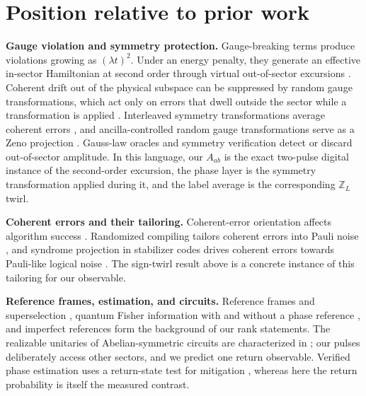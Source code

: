 \documentclass[11pt,a4paper]{article}
\begin{document}
\section*{Position relative to prior work}
\textbf{Gauge violation and symmetry protection.} Gauge-breaking terms produce violations growing as $(\lambda t)^2$. Under an energy penalty, they generate an effective in-sector Hamiltonian at second order through virtual out-of-sector excursions \cite{halimeh2020}. Coherent drift out of the physical subspace can be suppressed by random gauge transformations, which act only on errors that dwell outside the sector while a transformation is applied \cite{lamm2020}. Interleaved symmetry transformations average coherent errors \cite{tran2021}, and ancilla-controlled random gauge transformations serve as a Zeno projection \cite{ball2024}. Gauss-law oracles \cite{stryker2019} and symmetry verification \cite{bonetmonroig2018,sagastizabal2019} detect or discard out-of-sector amplitude. In this language, our $A_{ab}$ is the exact two-pulse digital instance of the second-order excursion, the phase layer is the symmetry transformation applied during it, and the label average is the corresponding $\mathbb Z_L$ twirl.

\textbf{Coherent errors and their tailoring.} Coherent-error orientation affects algorithm success \cite{murphy2019}. Randomized compiling tailors coherent errors into Pauli noise \cite{wallman2016,hashim2021}, and syndrome projection in stabilizer codes drives coherent errors towards Pauli-like logical noise \cite{beale2018,bravyi2018}. The sign-twirl result above is a concrete instance of this tailoring for our observable.

\textbf{Reference frames, estimation, and circuits.} Reference frames and superselection \cite{bartlett2007}, quantum Fisher information with and without a phase reference \cite{jarzyna2012}, and imperfect references \cite{safranek2015} form the background of our rank statements. The realizable unitaries of Abelian-symmetric circuits are characterized in \cite{marvian2024}; our pulses deliberately access other sectors, and we predict one return observable. Verified phase estimation uses a return-state test for mitigation \cite{obrien2021}, whereas here the return probability is itself the measured contrast.
\end{document}
